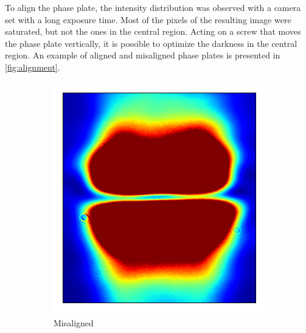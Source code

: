 To align the phase plate, the intensity distribution was observed with a camera set with a long exposure time. Most of the pixels of the resulting image were saturated, but not the ones in the central region. Acting on a screw that moves the phase plate vertically, it is possible to optimize the darkness in the central region. An example of aligned and misaligned phase plates is presented in \cref{fig:alignment}.
\begin{figure}
    \begin{subfigure}{0.3\textwidth}
        \includegraphics[width=\textwidth]{chapters/chapter_3/figures/align1.pdf}
        \caption{Misaligned}
    \end{subfigure}
    \hfill
    \begin{subfigure}{0.3\textwidth}

\end{subfigure}
\end{figure}
